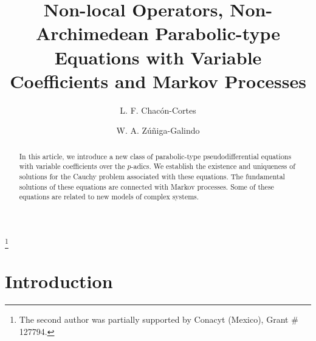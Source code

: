 \documentclass{amsart}\usepackage{amsfonts}
\theoremstyle{plain}
\numberwithin{equation}{section}
\begin{document}
\title[Non-Archimedean Parabolic-type Equations ]{Non-local Operators, Non-Archimedean Parabolic-type Equations with Variable
Coefficients and Markov Processes}
\author{L. F. Chacón-Cortes}
\author{W. A. Zúñiga-Galindo}
\address{Centro de Investigación y de Estudios Avanzados del Instituto Politécnico Nacional\\
Departamento de Matemáticas- Unidad Querétaro\\
Libramiento Norponiente \#2000, Fracc. Real de Juriquilla. Santiago de
Querétaro, Qro. 76230\\
México}
\thanks{The second author was partially supported by Conacyt (Mexico), Grant \# 127794.}

\begin{abstract}
In this article, we introduce a new class of parabolic-type
pseudo\-\-\allowbreak differential equations with variable coefficients over
the $p$-adics. We establish the existence and uniqueness of solutions for the
Cauchy problem associated with these equations. The fundamental solutions of
these equations are connected with Markov processes. Some of these equations
are related to new models of complex systems.

\end{abstract}
\maketitle


\section{Introduction}
\end{document}
